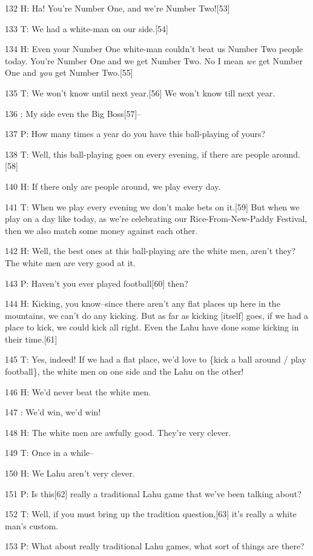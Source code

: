 132 H: Ha! You're Number One, and we're Number Two![53]

133 T: We had a white-man on our side.[54]

134 H: Even your Number One white-man couldn't beat us Number Two people today.
You're Number One and we get Number Two. No I mean \textit{we} get Number One and
\textit{you} get Number Two.[55]

135 T: We won't know until next year.[56] We won't know till next year.

136    : My side even the Big Boss[57]--

137 P: How many times a year do you have this ball-playing of yours?

138 T: Well, this ball-playing goes on every evening, if there are people around.[58]

140 H: If there only are people around, we play every day.

141 T: When we play every evening we don't make bets on it.[59] But when we play
on a day like today, as we're celebrating our Rice-From-New-Paddy Festival, then
we also match some money against each other.

142 H: Well, the best ones at this ball-playing are the white men, aren't they?
The white men are very good at it.

143 P: Haven't you ever played football[60] then?

144 H: Kicking, you know--since there aren't any flat places up here in the mountains,
we can't do any kicking. But as far as kicking [itself] goes, if we had a place
to kick, we could kick all right. Even the Lahu have done some kicking in their
time.[61]

145 T: Yes, indeed! If we had a flat place, we'd love to \{kick a ball around /
play football\}, the white men on one side and the Lahu on the other!

146 H: We'd never beat the white men.

147    : We'd win, we'd win!

148 H: The white men are awfully good. They're very clever.

149 T: Once in a while--

150 H: We Lahu aren't very clever.

151 P: Is this[62] really a traditional Lahu game that we've been talking about?

152 T: Well, if you must bring up the tradition question,[63] it's really a white
man's custom.

153 P: What about really traditional Lahu games, what sort of things are there?

